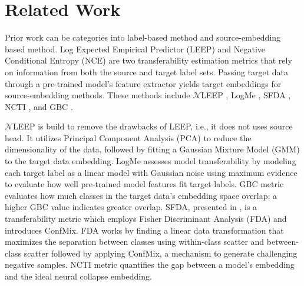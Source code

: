 \section{Related Work}

Prior work can be categories into label-based method and source-embedding based method. Log Expected Empirical Predictor (LEEP) \cite{nguyen2020leep} and Negative Conditional Entropy (NCE) \cite{tran2019transferability} are two transferability estimation metrics that rely on information from both the source and target label sets. %
Passing target data through a pre-trained model's feature extractor yields target embeddings for source-embedding methods. These methods include $\mathcal{N}$LEEP \cite{li2021ranking}, LogMe \cite{you2021logme}, SFDA \cite{shao2022not}, NCTI \cite{DBLP:conf/iccv/WangLZHB23}, and GBC \cite{Pandy2022TransferabilityEstimation}.


$\mathcal{N}$LEEP \cite{li2021ranking} is build to remove the drawbacks of LEEP, i.e., it does not uses source head. It utilizes Principal Component Analysis (PCA) \cite{wold1987principal} to reduce the dimensionality of the data, followed by fitting a Gaussian Mixture Model (GMM) \cite{reynolds2009gaussian} to the target data embedding. LogMe \cite{you2021logme} assesses model transferability by modeling each target label as a linear model with Gaussian noise using maximum evidence to evaluate how well pre-trained model features fit target labels. GBC \cite{Pandy2022TransferabilityEstimation} metric evaluates how much classes in the target data's embedding space overlap; a higher GBC value indicates greater overlap. SFDA, presented in \cite{shao2022not}, is a transferability metric which employs Fisher Discriminant Analysis (FDA) \cite{mika1999fisher} and introduces ConfMix. FDA works by finding a linear data transformation that maximizes the separation between classes using within-class scatter and between-class scatter followed by applying ConfMix, a mechanism to generate challenging negative samples. NCTI \cite{DBLP:conf/iccv/WangLZHB23} metric quantifies the gap between a model's embedding and the ideal neural collapse embedding. 

